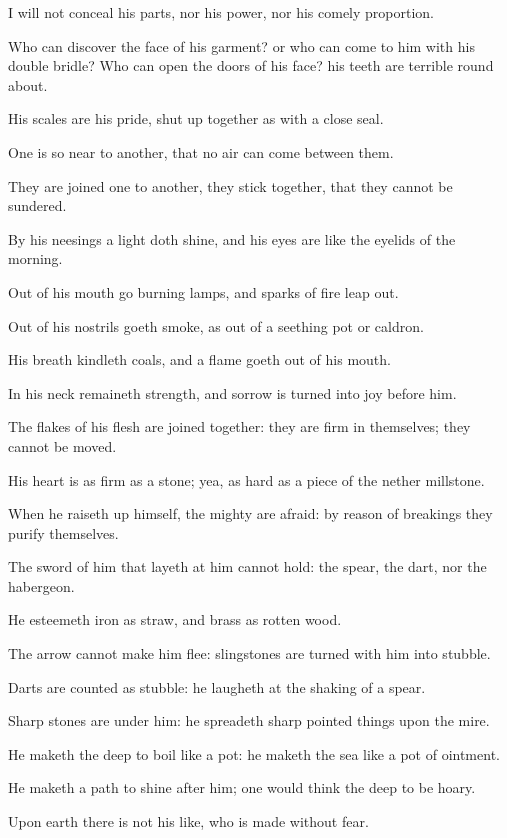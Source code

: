 \Verse I will not conceal his parts, nor his power, nor his comely proportion.

\Verse Who can discover the face of his garment? or who can come to him with his double bridle?  \Verse Who can open the doors of his face? his teeth are terrible round about.

\Verse His scales are his pride, shut up together as with a close seal.

\Verse One is so near to another, that no air can come between them.

\Verse They are joined one to another, they stick together, that they cannot be sundered.

\Verse By his neesings a light doth shine, and his eyes are like the eyelids of the morning.

\Verse Out of his mouth go burning lamps, and sparks of fire leap out.

\Verse Out of his nostrils goeth smoke, as out of a seething pot or caldron.

\Verse His breath kindleth coals, and a flame goeth out of his mouth.

\Verse In his neck remaineth strength, and sorrow is turned into joy before him.

\Verse The flakes of his flesh are joined together: they are firm in themselves; they cannot be moved.

\Verse His heart is as firm as a stone; yea, as hard as a piece of the nether millstone.

\Verse When he raiseth up himself, the mighty are afraid: by reason of breakings they purify themselves.

\Verse The sword of him that layeth at him cannot hold: the spear, the dart, nor the habergeon.

\Verse He esteemeth iron as straw, and brass as rotten wood.

\Verse The arrow cannot make him flee: slingstones are turned with him into stubble.

\Verse Darts are counted as stubble: he laugheth at the shaking of a spear.

\Verse Sharp stones are under him: he spreadeth sharp pointed things upon the mire.

\Verse He maketh the deep to boil like a pot: he maketh the sea like a pot of ointment.

\Verse He maketh a path to shine after him; one would think the deep to be hoary.

\Verse Upon earth there is not his like, who is made without fear.

